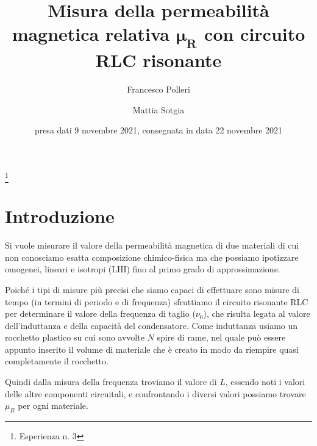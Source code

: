 \documentclass[
    prl,
    floatfix,
    reprint, 
    superscriptaddress, 
    altaffilletter, 
    amsmath, 
    amssymb, 
    a4paper]{revtex4-2}
\begin{document}
\title{Misura della permeabilità magnetica relativa $\mathbf{\mu_R}$ con circuito RLC risonante
}
\thanks{Esperienza n. 3
}

\author{Francesco Polleri}
\author{Mattia Sotgia}


\date{presa dati
    9 novembre 2021, consegnata in data
    22 novembre 2021
}

\begin{abstract}
    
\end{abstract}
\maketitle
\thispagestyle{fancy}
\SetBgContents{
}


\section*{Introduzione}\label{sec:introduction}
Si vuole misurare il valore della permeabilità magnetica di due materiali di cui non conosciamo esatta composizione chimico-fisica ma che possiamo ipotizzare omogenei, lineari e isotropi (LHI) fino al primo grado di approssimazione. 

Poiché i tipi di misure più precisi che siamo capaci di effettuare sono misure di tempo (in termini di periodo e di frequenza) sfruttiamo il circuito risonante RLC per determinare il valore della frequenza di taglio ($\nu_0$), che risulta legata al valore dell'induttanza e della capacità del condensatore. Come induttanza usiamo un rocchetto plastico su cui sono avvolte $N$ spire di rame, nel quale può essere appunto inserito il volume di materiale che è creato in modo da riempire quasi completamente il rocchetto. 

Quindi dalla misura della frequenza troviamo il valore di $L$, essendo noti i valori delle altre componenti circuitali, e confrontando i diversi valori possiamo trovare $\mu_R$ per ogni materiale.
\end{document}
